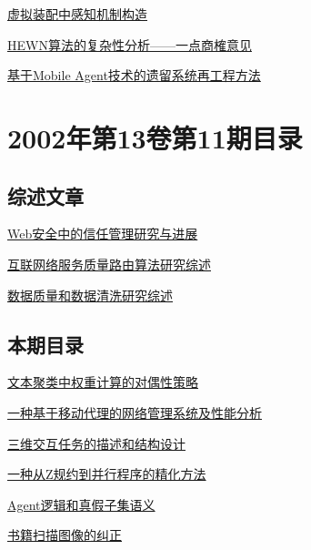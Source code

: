 \documentclass[a4paper]{article}
\begin{document}
\href{http://www.jos.org.cn/ch/reader/download_pdf.aspx?file_no=20021215&year_id=2002&quarter_id=12&falg=1}{虚拟装配中感知机制构造}

\href{http://www.jos.org.cn/ch/reader/download_pdf.aspx?file_no=20021217&year_id=2002&quarter_id=12&falg=1}{HEWN算法的复杂性分析——一点商榷意见}

\href{http://www.jos.org.cn/ch/reader/download_pdf.aspx?file_no=20021218&year_id=2002&quarter_id=12&falg=1}{基于Mobile Agent技术的遗留系统再工程方法}


\section{\textbf{2002年第13卷第11期目录}}
\subsection{综述文章}
\href{http://www.jos.org.cn/ch/reader/download_pdf.aspx?file_no=20021101&year_id=2002&quarter_id=11&falg=1}{Web安全中的信任管理研究与进展}

\href{http://www.jos.org.cn/ch/reader/download_pdf.aspx?file_no=20021102&year_id=2002&quarter_id=11&falg=1}{互联网络服务质量路由算法研究综述}

\href{http://www.jos.org.cn/ch/reader/download_pdf.aspx?file_no=20021103&year_id=2002&quarter_id=11&falg=1}{数据质量和数据清洗研究综述}

\subsection{本期目录}
\href{http://www.jos.org.cn/ch/reader/download_pdf.aspx?file_no=20021104&year_id=2002&quarter_id=11&falg=1}{文本聚类中权重计算的对偶性策略}

\href{http://www.jos.org.cn/ch/reader/download_pdf.aspx?file_no=20021105&year_id=2002&quarter_id=11&falg=1}{一种基于移动代理的网络管理系统及性能分析}

\href{http://www.jos.org.cn/ch/reader/download_pdf.aspx?file_no=20021106&year_id=2002&quarter_id=11&falg=1}{三维交互任务的描述和结构设计}

\href{http://www.jos.org.cn/ch/reader/download_pdf.aspx?file_no=20021107&year_id=2002&quarter_id=11&falg=1}{一种从Z规约到并行程序的精化方法}

\href{http://www.jos.org.cn/ch/reader/download_pdf.aspx?file_no=20021108&year_id=2002&quarter_id=11&falg=1}{Agent逻辑和真假子集语义}

\href{http://www.jos.org.cn/ch/reader/download_pdf.aspx?file_no=20021109&year_id=2002&quarter_id=11&falg=1}{书籍扫描图像的纠正}
\end{document}
